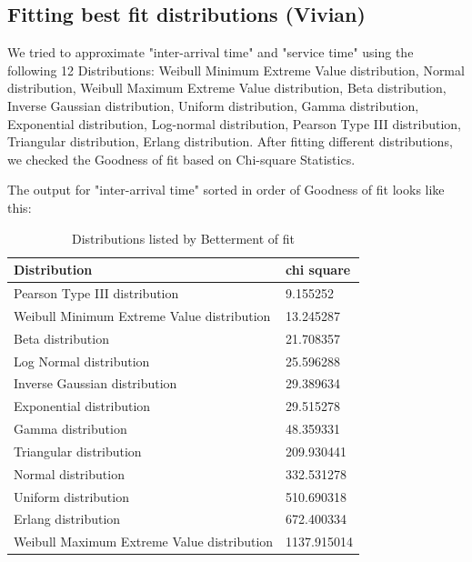 \documentclass{article}
\begin{document}
\subsection{Fitting best fit distributions (Vivian)}

We tried to approximate "inter-arrival time" and "service time" using the following 12 Distributions: Weibull Minimum Extreme Value distribution, Normal distribution, Weibull Maximum Extreme Value distribution, Beta distribution, Inverse Gaussian distribution, Uniform distribution, Gamma distribution, Exponential distribution, Log-normal distribution, Pearson Type III distribution, Triangular distribution, Erlang distribution. After fitting different distributions, we checked the Goodness of fit based on Chi-square Statistics.\newline

The output for "inter-arrival time" sorted in order of Goodness of fit looks like this:\newline

\begin{table}[h!]
    \centering
    \caption{Distributions listed by Betterment of fit}
    \begin{tabu}{*{2}{X[c]}}
        \toprule
        \textbf{Distribution} & \textbf{chi square}\\
        \midrule
        Pearson Type III distribution & 9.155252\\
        Weibull Minimum Extreme Value distribution & 13.245287\\
        Beta distribution & 21.708357\\
        Log Normal distribution & 25.596288\\
        Inverse Gaussian distribution & 29.389634\\
        Exponential distribution & 29.515278\\
        Gamma distribution & 48.359331\\
        Triangular distribution & 209.930441\\
        Normal distribution & 332.531278\\
        Uniform distribution & 510.690318\\
        Erlang distribution & 672.400334\\
        Weibull Maximum Extreme Value distribution & 1137.915014\\
        \bottomrule
    \end{tabu}
    \label{tab:Inter-arrival Best Fit}
\end{table}
\end{document}
